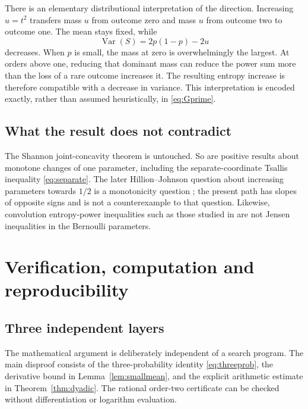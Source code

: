 \documentclass[11pt]{article}
\numberwithin{equation}{section}
\theoremstyle{definition}
\theoremstyle{remark}
\newcommand{\Var}{\operatorname{Var}}
\begin{document}
There is an elementary distributional interpretation of the direction.
Increasing $u=t^2$ transfers mass $u$ from outcome zero and mass $u$ from
outcome two to outcome one. The mean stays fixed, while
\begin{equation}
 \Var(S)=2p(1-p)-2u
\end{equation}
decreases. When $p$ is small, the mass at zero is overwhelmingly the largest.
At orders above one, reducing that dominant mass can reduce the power sum
more than the loss of a rare outcome increases it. The resulting entropy
increase is therefore compatible with a decrease in variance. This
interpretation is encoded exactly, rather than assumed heuristically, in
\eqref{eq:Gprime}.

\subsection{What the result does not contradict}
The Shannon joint-concavity theorem is untouched. So are positive results
about monotone changes of one parameter, including the separate-coordinate
Tsallis inequality \eqref{eq:separate}. The later Hillion--Johnson question
about increasing parameters towards $1/2$ is a monotonicity question
\cite[Section~4]{HJ2019}; the present path has slopes of opposite signs and
is not a counterexample to that question. Likewise, convolution
entropy-power inequalities such as those studied in \cite{MMR2023} are not
Jensen inequalities in the Bernoulli parameters.

\section{Verification, computation and reproducibility}
\subsection{Three independent layers}
The mathematical argument is deliberately independent of a search program.
The main disproof consists of the three-probability identity
\eqref{eq:threeprob}, the derivative bound in
Lemma~\ref{lem:smallmean}, and the explicit arithmetic estimate in
Theorem~\ref{thm:dyadic}. The rational order-two certificate can be checked
without differentiation or logarithm evaluation.
\end{document}
